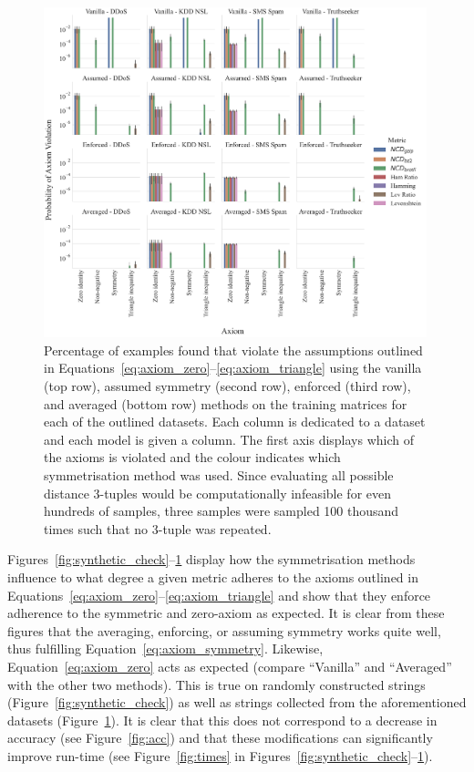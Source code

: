 \documentclass[preprint,12pt]{article}
\begin{document}
\begin{figure}[p!]
    \centering
    \includegraphics[width=0.99\textwidth]{images/real_world_check.pdf}
    \caption{
    Percentage of examples found that violate the assumptions outlined in Equations~\ref{eq:axiom_zero}--\ref{eq:axiom_triangle} using the vanilla (top row), assumed symmetry (second row), enforced (third row), and averaged (bottom row) methods on the training matrices for each of the outlined datasets. Each column is dedicated to a dataset and each model is given a column. The first axis displays which of the axioms is violated and the colour indicates which symmetrisation method was used. Since evaluating all possible distance 3-tuples would be computationally infeasible for even hundreds of samples, three samples were sampled  100 thousand times such that no 3-tuple was repeated.
    }
    \label{fig:real_world_check}
\end{figure}

Figures~\ref{fig:synthetic_check}--\ref{fig:real_world_check} display how the symmetrisation methods influence to what degree a given metric adheres to the axioms outlined in Equations~\ref{eq:axiom_zero}--\ref{eq:axiom_triangle} and show that they enforce adherence to the symmetric and zero-axiom as expected.
It is clear from these figures that the averaging, enforcing, or assuming symmetry works quite well, thus fulfilling Equation~\ref{eq:axiom_symmetry}.
Likewise, Equation~\ref{eq:axiom_zero} acts as expected (compare ``Vanilla'' and ``Averaged'' with the other two methods). 
This is true on randomly constructed strings (Figure~\ref{fig:synthetic_check}) as well as strings collected from the aforementioned datasets (Figure~\ref{fig:real_world_check}). 
It is clear that this does not correspond to a decrease in accuracy (see Figure~\ref{fig:acc}) and that these modifications can significantly improve run-time (see Figure~\ref{fig:times} in Figures~\ref{fig:synthetic_check}--\ref{fig:real_world_check}).
\end{document}

